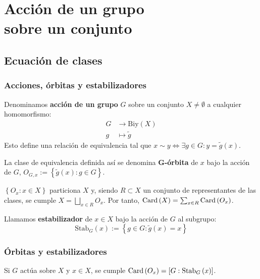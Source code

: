 \chapter{Acción de un grupo\\ sobre un conjunto}
\section{Ecuación de clases}
\subsection{Acciones, órbitas y estabilizadores}

\begin{defi}
Denominamos \textbf{acción de un grupo} $G$ sobre un conjunto $X \neq \emptyset$ a cualquier homomorfismo:
\begin{align*}
    G &\rightarrow \mathrm{Biy}\left( X \right)\\ 
    g &\mapsto \tilde{g}
\end{align*}
Esto define una relación de equivalencia tal que $x \sim y \Leftrightarrow \exists g \in G : y = \tilde{g}\left( x \right)$.

La clase de equivalencia definida así se denomina $\mathbf{G}$\textbf{-órbita} de $x$ bajo la acción de $G$, $O_{G, x} := \left\{ \tilde{g}\left( x \right) : g \in G \right\}$.
\end{defi}
\begin{obs}
$\left\{ O_x : x \in X \right\}$ particiona $X$ y, siendo $R \subset X$ un conjunto de representantes de las clases, se cumple $X = \bigsqcup_{x \in R} O_x$. Por tanto, $\operatorname{Card}\left( X \right) = \sum_{x \in R} \operatorname{Card}\left( O_x \right)$. 
\end{obs}

\begin{defi}
Llamamos \textbf{estabilizador} de $x \in X$ bajo la acción de $G$ al subgrupo:
\[
\mathrm{Stab}_G \left( x \right) := \left\{ g \in G : \tilde{g}\left( x \right) = x \right\}
\]
\end{defi}

\subsection{Órbitas y estabilizadores}
\begin{prop}
Si $G$ actúa sobre $X$ y $x \in X$, se cumple $\operatorname{Card}\left( O_x \right) = \left[ G : \mathrm{Stab}_G\left( x \right) \right]$.
\end{prop}

